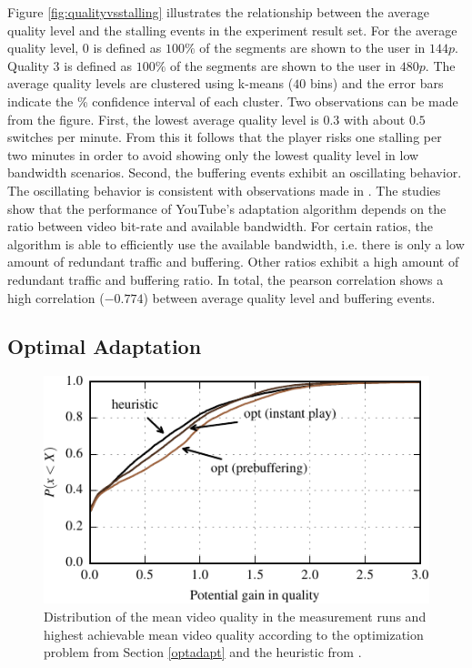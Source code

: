 Figure \ref{fig:qualityvsstalling} illustrates the relationship between the average quality level and the stalling events in the experiment result set.
For the average quality level, $0$ is defined as $100\%$ of the segments are shown to the user in $144p$. Quality $3$ is defined as $100\%$ of the segments are shown to the user in $480p$.
The average quality levels are clustered using k-means ($40$ bins) and the error bars indicate the \unit[95]{\%} confidence interval of each cluster.
Two observations can be made from the figure. 
First, the lowest average quality level is $0.3$ with about $0.5$ switches per minute.
From this it follows that the player risks one stalling per two minutes in order to avoid showing only the lowest quality level in low bandwidth scenarios.
Second, the buffering events exhibit an oscillating behavior.
The oscillating behavior is consistent with observations made in \cite{sieber16sacrificing, casas2012youtube}.
The studies show that the performance of YouTube's adaptation algorithm depends on the ratio between video bit-rate and available bandwidth.
For certain ratios, the algorithm is able to efficiently use the available bandwidth, i.e. there is only a low amount of redundant traffic and buffering.
Other ratios exhibit a high amount of redundant traffic and buffering ratio.
In total, the pearson correlation shows a high correlation ($-0.774$) between average quality level and buffering events.

\subsection{Optimal Adaptation}

\begin{figure}[t]
\centering
\includegraphics[width=\columnwidth]{figs/qualitygain_py}%
\caption{Distribution of the mean video quality in the measurement runs and highest achievable mean video quality according to the optimization problem from Section \ref{optadapt} and the heuristic from \cite{sieber16sacrificing}.}
\label{fig:opt}%
\end{figure}

